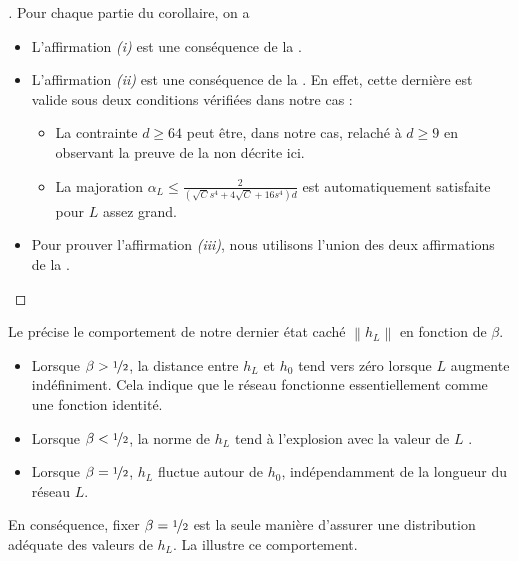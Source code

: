 \begin{proof}[]
    Pour chaque partie du corollaire, on a
    \begin{itemize}
        \item L'affirmation \textit{(i)} est une conséquence de la .
        \item L'affirmation \textit{(ii)} est une conséquence de la . En effet, cette dernière est valide sous deux conditions vérifiées dans notre cas : \begin{itemize}
            \item La contrainte $ d \geqslant 64 $ peut être, dans notre cas, relaché à $ d \geqslant 9 $ en observant la preuve de la  non décrite ici.
            \item La majoration $ \alpha _L \leqslant \frac{2}{(\sqrt{C} s^4 + 4 \sqrt{C} + 16s^4)d} $ est automatiquement satisfaite pour $ L $ assez grand.
        \end{itemize}
        \item Pour prouver l'affirmation \textit{(iii)}, nous utilisons l'union des deux affirmations de la .
    \end{itemize}
\end{proof}
Le  précise le comportement de notre dernier état caché $\left\| h_L \right\|$ en fonction de $\beta$.
\begin{itemize}
    \item Lorsque $\beta > \nicefrac{1}{2}$, la distance entre $h_L$ et $h_0$ tend vers zéro lorsque $L$ augmente indéfiniment. Cela indique que le réseau fonctionne essentiellement comme une fonction identité.
    \item Lorsque $\beta < \nicefrac{1}{2}$, la norme de $h_L$ tend à l'explosion avec la valeur de $ L $ .
    \item Lorsque $\beta = \nicefrac{1}{2}$, $h_L$ fluctue autour de $h_0$, indépendamment de la longueur du réseau $L$.
\end{itemize}
En conséquence, fixer $\beta = \nicefrac{1}{2}$ est la seule manière d'assurer une distribution adéquate des valeurs de $h_L$. La  illustre ce comportement.


